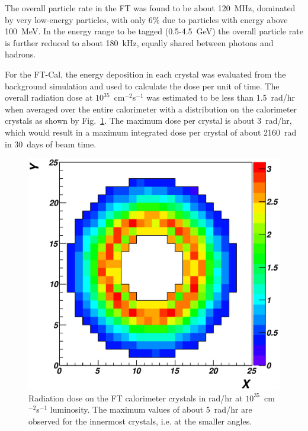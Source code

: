 The overall particle rate in the FT was found to be about 120~MHz, dominated by very low-energy particles, with
only 6\% due to particles with energy above 100~MeV. In the energy range to be tagged (0.5-4.5~GeV) the overall
particle rate is further reduced to about 180~kHz, equally shared between photons and hadrons. 

For the FT-Cal, the energy deposition in each crystal was evaluated from the background simulation and used to
calculate the dose per unit of time. The overall radiation dose at $10^{35}$~cm$^{-2}$s$^{-1}$ was estimated to be
less than 1.5~rad/hr when averaged over the entire calorimeter with a distribution on the calorimeter crystals as
shown by Fig.~\ref{fig:ft_rad}. The maximum dose per crystal is about 3~rad/hr, which would result in a maximum
integrated dose per crystal of about 2160~rad in 30~days of beam time.

\begin{figure}
\includegraphics[height=0.9\columnwidth]{fig/ft_rad.eps}
\caption{Radiation dose on the FT calorimeter crystals in rad/hr at $10^{35}$~cm$^{-2}$s$^{-1}$ luminosity. The
  maximum values of about 5~rad/hr are observed for the innermost crystals, i.e. at the smaller angles.}
\label{fig:ft_rad}
\end{figure}
